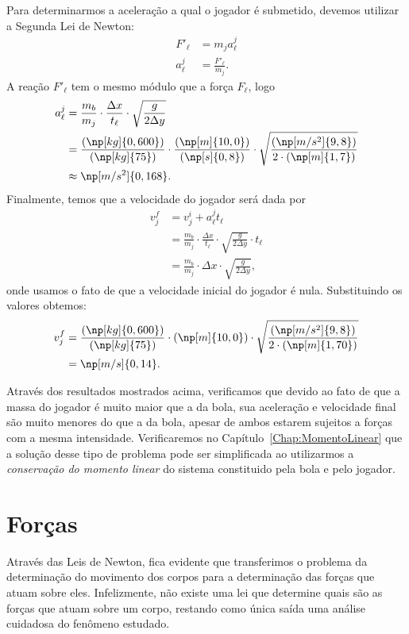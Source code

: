 Para determinarmos a aceleração a qual o jogador é submetido, devemos utilizar a Segunda Lei de Newton:
\begin{align}
    F'_\ell &= m_j a_\ell^j \\
    a_\ell^j &= \frac{F'_\ell}{m_j}.
\end{align}
%
A reação $F'_\ell$ tem o mesmo módulo que a força $F_\ell$, logo
\begin{align}
    a_\ell^j &= \frac{m_b}{m_j}\cdot\frac{\Delta x}{t_\ell} \cdot \sqrt{\frac{g}{2\Delta y}}\\
    &= \frac{(\np[kg]{0,600})}{(\np[kg]{75})} \cdot \frac{(\np[m]{10,0})}{(\np[s]{0,8})} \cdot \sqrt{\frac{(\np[m/s^2]{9,8})}{2\cdot(\np[m]{1,7})}} \\
    &\approx \np[m/s^2]{0,168}.
\end{align}
%
Finalmente, temos que a velocidade do jogador será dada por
\begin{align}
    v_j^f &= v_j^i + a_\ell^j t_\ell \\
    &= \frac{m_b}{m_j}\cdot\frac{\Delta x}{t_\ell} \cdot \sqrt{\frac{g}{2\Delta y}} \cdot t_\ell \\
    &= \frac{m_b}{m_j} \cdot \Delta x \cdot \sqrt{\frac{g}{2\Delta y}},
\end{align}
%
onde usamos o fato de que a velocidade inicial do jogador é nula. Substituindo os valores obtemos:
\begin{align}
    v_j^f &= \frac{(\np[kg]{0,600})}{(\np[kg]{75})} \cdot (\np[m]{10,0}) \cdot \sqrt{\frac{(\np[m/s^2]{9,8})}{2\cdot(\np[m]{1,70})}} \\
    &= \np[m/s]{0,14}.
\end{align}

Através dos resultados mostrados acima, verificamos que devido ao fato de que a massa do jogador é muito maior que a da bola, sua aceleração e velocidade final são muito menores do que a da bola, apesar de ambos estarem sujeitos a forças com a mesma intensidade. Verificaremos no Capítulo~\ref{Chap:MomentoLinear} que a solução desse tipo de problema pode ser simplificada ao utilizarmos a \emph{conservação do momento linear} do sistema constituido pela bola e pelo jogador.

\section{Forças}

Através das Leis de Newton, fica evidente que transferimos o problema da determinação do movimento dos corpos para a determinação das forças que atuam sobre eles. Infelizmente, não existe uma lei que determine quais são as forças que atuam sobre um corpo, restando como única saída uma análise cuidadosa do fenômeno estudado.

